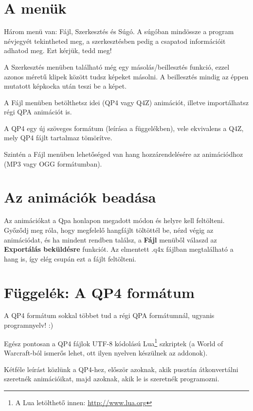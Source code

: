 \documentclass[a4paper,12pt,release]{article}
\begin{document}
\section{A menük}
Három menü van: Fájl, Szerkesztés és Súgó. A súgóban mindössze a program névjegyét tekintheted meg, a szerkesztésben pedig a csapatod információit adhatod meg. Ezt kérjük, tedd meg!

A Szerkesztés menüben található még egy másolás/beillesztés funkció, ezzel azonos méretű klipek között tudsz képeket másolni. A beillesztés mindig az éppen mutatott képkocka után teszi be a képet.

A Fájl menüben betölthetsz idei (QP4 vagy Q4Z) animációt, illetve importálhatsz régi QPA animációt is.

A QP4 egy új szöveges formátum (leírása a függelékben), vele ekvivalens a Q4Z, mely QP4 fájlt tartalmaz tömörítve.

Szintén a Fájl menüben lehetőséged van hang hozzárendelésére az animációdhoz (MP3 vagy OGG formátumban).
\section{Az animációk beadása}
Az animációkat a Qpa honlapon megadott módon és helyre kell feltölteni. Győződj meg róla, hogy megfelelő hangfájlt töltöttél be, nézd végig az animációdat, és ha mindent rendben találsz, a {\bf Fájl} menüből válaszd az {\bf Exportálás beküldésre} funkciót. Az elmentett .q4x fájlban megtalálható a hang is, így elég csupán ezt a fájlt feltölteni.
\clearpage
\section{Függelék: A QP4 formátum}
A QP4 formátum sokkal többet tud a régi QPA formátumnál, ugyanis programnyelv! :)

Egész pontosan a QP4 fájlok UTF-8 kódolású Lua\footnote{A Lua letölthető innen: \href{http://www.lua.org}{http://www.lua.org}} szkriptek (a \foreignlanguage{english}{World of Warcraft}-ból ismerős lehet, ott ilyen nyelven készülnek az addonok).

Kétféle leírást közlünk a QP4-hez, először azoknak, akik pusztán átkonvertálni szeretnék animációikat, majd azoknak, akik le is szeretnék programozni.
\end{document}
